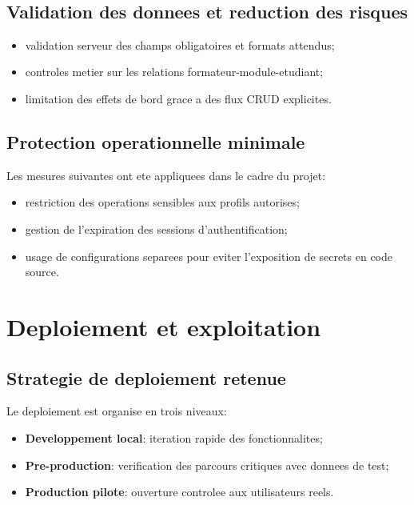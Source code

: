 ﻿﻿\documentclass[12pt,a4paper,oneside]{report}
\begin{document}
\subsection{Validation des donnees et reduction des risques}

\begin{itemize}
  \item validation serveur des champs obligatoires et formats attendus;
  \item controles metier sur les relations formateur-module-etudiant;
  \item limitation des effets de bord grace a des flux CRUD explicites.
\end{itemize}

\subsection{Protection operationnelle minimale}

Les mesures suivantes ont ete appliquees dans le cadre du projet:
\begin{itemize}
  \item restriction des operations sensibles aux profils autorises;
  \item gestion de l'expiration des sessions d'authentification;
  \item usage de configurations separees pour eviter l'exposition de secrets en code source.
\end{itemize}

\section{Deploiement et exploitation}

\subsection{Strategie de deploiement retenue}

Le deploiement est organise en trois niveaux:
\begin{itemize}
  \item \textbf{Developpement local}: iteration rapide des fonctionnalites;
  \item \textbf{Pre-production}: verification des parcours critiques avec donnees de test;
  \item \textbf{Production pilote}: ouverture controlee aux utilisateurs reels.
\end{itemize}
\end{document}
